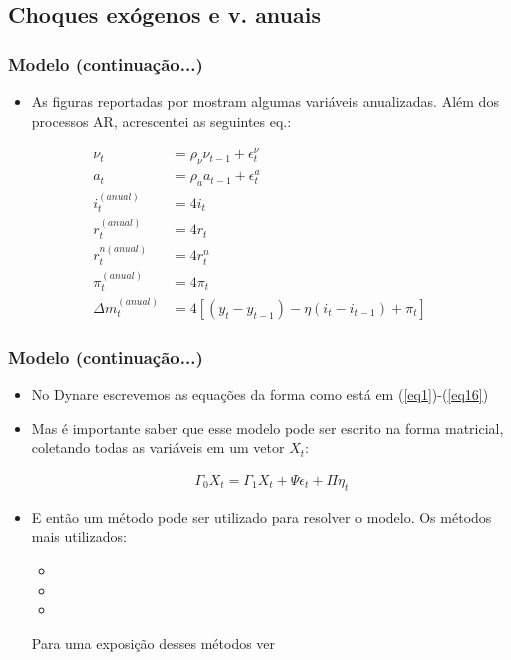 \documentclass[xcolor=pdftex,dvipsnames,table]{beamer}
\newcommand{\ft}{\frametitle}
\begin{document}
\subsection{Choques exógenos e v. anuais}

\begin{frame}[fragile]
\ft{Modelo (continuação...)}

\begin{itemize}
\item As figuras reportadas por  mostram algumas variáveis anualizadas. Além dos processos AR, acrescentei as seguintes eq.:
\end{itemize}
\vspace{-0.4cm}
\begin{align}
\nu_t &= \rho_{\nu} \nu_{t-1} + \epsilon_t^{\nu}
\label{eq10}\\
a_t &= \rho_a a_{t-1} + \epsilon_t^a
\label{eq11}\\
i_t^{(anual)} &= 4 i_t
\label{eq12}\\
r_t^{(anual)} &= 4 r_t
\label{eq13}\\
r_t^{n(anual)} &= 4 r_t^n
\label{eq14}\\
\pi_t^{(anual)} &= 4 \pi_t
\label{eq15}\\
\Delta m_t^{(anual)} &= 4[(y_t - y_{t-1}) - \eta (i_t - i_{t-1}) + \pi_t]
\label{eq16} 
\end{align}

\end{frame}



\begin{frame}[fragile]
\ft{Modelo (continuação...)}

\begin{itemize}
\item No Dynare escrevemos as equações da forma como está em (\ref{eq1})-(\ref{eq16})
\item Mas é importante saber que esse modelo pode ser escrito na forma matricial, coletando todas as variáveis em um vetor $X_t$:

\begin{align}
\Gamma_0 X_t = \Gamma_1 X_t + \Psi \epsilon_t + \Pi \eta_t
\label{eq17}
\end{align}

\item E então um método pode ser utilizado para resolver o modelo. Os métodos mais utilizados:

	\begin{itemize}
	\item {}
	\item {}
	\item {}
	\end{itemize}
\footnotesize{Para uma exposição desses métodos ver }
\end{itemize}

\end{frame}
\end{document}
